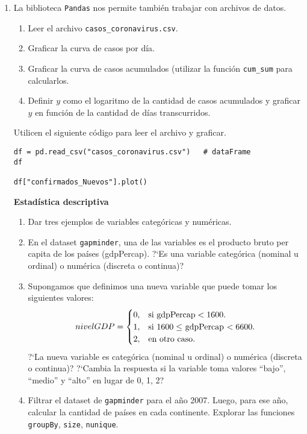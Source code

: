 \documentclass[a4paper,11pt]{article}
\theoremstyle{definition}
\begin{document}
\begin{enumerate}[resume]
\item La biblioteca \lstinline{Pandas} nos permite tambi\'en trabajar con archivos de datos.

\begin{enumerate}
\item Leer el archivo \lstinline{casos_coronavirus.csv}.
\item Graficar la curva de casos por d\'ia.
\item Graficar la curva de casos acumulados (utilizar la función \lstinline{cum_sum} para calcularlos.
\item Definir $y$ como el logaritmo de la cantidad de casos acumulados y graficar $y$ en funci\'on de la cantidad de d\'ias transcurridos.
\end{enumerate}
Utilicen el siguiente c\'odigo para leer el archivo y graficar.

\begin{lstlisting}
df = pd.read_csv("casos_coronavirus.csv")   # dataFrame
df

df["confirmados_Nuevos"].plot()
\end{lstlisting}

\textbf{\large Estad\'istica descriptiva}
\begin{enumerate}[resume]

\item Dar tres ejemplos de variables categ\'oricas y num\'ericas.

\item En el dataset \lstinline{gapminder}, una de las variables es el producto bruto per capita de los pa\'ises (gdpPercap). ?`Es una variable categ\'orica (nominal u ordinal) o num\'erica (discreta o continua)?

\item Supongamos que definimos una nueva variable que puede tomar los siguientes valores:
\[
nivelGDP = \begin{cases}
0, & \text{si \lstinline{gdpPercap}} < 1600. \\
1, & \text{si $1600 \le $ \lstinline{gdpPercap} $< 6600$}. \\
2, & \text{en otro caso.} \\
\end{cases}
\]
?`La nueva variable
 es categ\'orica (nominal u ordinal) o num\'erica (discreta o continua)? ?`Cambia la respuesta si la variable
 toma valores ``bajo'', ``medio'' y ``alto'' en lugar de 0, 1, 2?

\item Filtrar el dataset de \lstinline{gapminder} para el a\~no 2007. Luego, para ese a\~no, calcular la cantidad de pa\'ises en cada continente. Explorar las funciones \lstinline{groupBy}, \lstinline{size}, \lstinline{nunique}.


\end{enumerate}
\end{enumerate}
\end{document}
